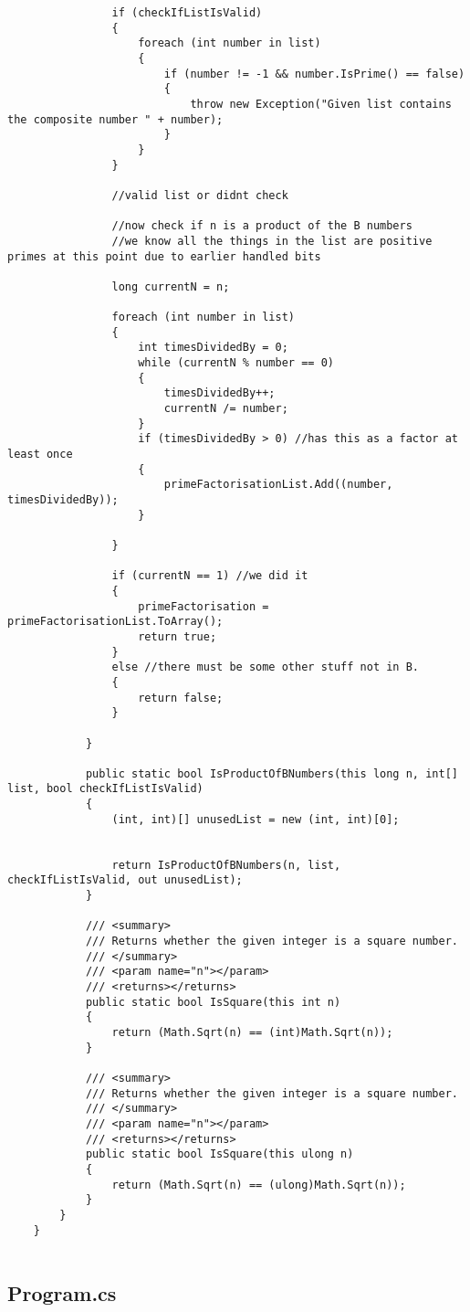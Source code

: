 \documentclass{article}
\begin{document}
\begin{lstlisting}
				if (checkIfListIsValid)
				{
					foreach (int number in list)
					{
						if (number != -1 && number.IsPrime() == false)
						{
							throw new Exception("Given list contains the composite number " + number);
						}
					}
				}
				
				//valid list or didnt check
				
				//now check if n is a product of the B numbers
				//we know all the things in the list are positive primes at this point due to earlier handled bits
				
				long currentN = n;
				
				foreach (int number in list)
				{
					int timesDividedBy = 0;
					while (currentN % number == 0)
					{
						timesDividedBy++;
						currentN /= number;
					}
					if (timesDividedBy > 0) //has this as a factor at least once
					{
						primeFactorisationList.Add((number, timesDividedBy));
					}
					
				}
				
				if (currentN == 1) //we did it
				{
					primeFactorisation = primeFactorisationList.ToArray();
					return true;
				}
				else //there must be some other stuff not in B.
				{
					return false;
				}
				
			}
			
			public static bool IsProductOfBNumbers(this long n, int[] list, bool checkIfListIsValid)
			{
				(int, int)[] unusedList = new (int, int)[0];
				
				
				return IsProductOfBNumbers(n, list, checkIfListIsValid, out unusedList);
			}
			
			/// <summary>
			/// Returns whether the given integer is a square number.
			/// </summary>
			/// <param name="n"></param>
			/// <returns></returns>
			public static bool IsSquare(this int n)
			{
				return (Math.Sqrt(n) == (int)Math.Sqrt(n));
			}
			
			/// <summary>
			/// Returns whether the given integer is a square number.
			/// </summary>
			/// <param name="n"></param>
			/// <returns></returns>
			public static bool IsSquare(this ulong n)
			{
				return (Math.Sqrt(n) == (ulong)Math.Sqrt(n));
			}
		}
	}
	
\end{lstlisting}

\subsection{Program.cs}
\end{document}
